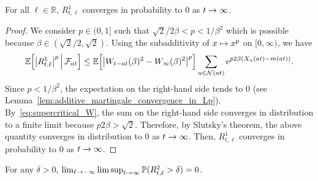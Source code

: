 \documentclass[AHL,Unicode,longabstracts,published]{cedram}
\newcommand{\e}{\mathrm{e}}
\newcommand{\E}{\mathbb{E}}
\renewcommand{\P}{\mathbb{P}}
\newcommand{\R}{\mathbb{R}}
\newcommand\1{\mathds{1}}
\newcommand{\cF}{\mathcal{F}}
\newcommand{\cN}{\mathcal{N}}
\newcommand{\Expec}[1]{\mathbb{E}\left[#1\right]}
\let\originalleft\left
\let\originalright\right
\renewcommand{\left}{\mathopen{}\mathclose\bgroup\originalleft}
\renewcommand{\right}{\aftergroup\egroup\originalright}
\renewcommand*{\to}{\mathchoice{\longrightarrow}{\rightarrow}{\rightarrow}{\rightarrow}}
\let\oldmapsto\mapsto
\renewcommand*{\mapsto}{\mathchoice{\longmapsto}{\oldmapsto}{\oldmapsto}{\oldmapsto}}
\begin{document}
\pagebreak

\begin{lemm}\label{lem:renormalized_subcritical_overlap_replacement}
For all $\ell \in \R$, $R_{t, \ell}^1$ converges in probability to $0$ as $t \to \infty$.
\end{lemm}

\begin{proof}
We consider $p \in (0,1]$ such that $\sqrt{2}/2\beta < p < 1/\beta^2$ which is possible because $\beta \in (\sqrt{2}/2, \sqrt{2})$. Using the subadditivity of $x \mapsto x^p$ on $[0, \infty)$, we have
\begin{equation*}
\E \left[\left|R_{t, \ell}^1\right|^p \,\middle|\, \cF_{at} \right]
\leq \Expec{ \left|W_{t - at}(\beta)^2 - W_\infty(\beta)^2\right|^p } \sum_{u \in \cN(at)} \e^{p2\beta(X_u(at) - m(at))}.
\end{equation*}
Since $p <1/\beta^2$, the expectation on the right-hand side tends to 0 (see Lemma~\ref{lem:additive_martingale_convergence_in_Lp}). By~\eqref{eq:supercritical_W}, the sum on the right-hand side converges in distribution to a finite limit because $p 2\beta > \sqrt{2}$. Therefore, by Slutsky's theorem, the above quantity converges in distribution to $0$ as $t \to \infty$. Then, $R_{t, \ell}^1$ converges in probability to $0$ as $t \to \infty$.
\end{proof}

\begin{lemm}\label{lem:renormalized_subcritical_overlap_contribution}
For any $\delta > 0$, $\lim_{\ell \to -\infty} \limsup_{t \to \infty} \P(R_{t,\ell}^2 > \delta) = 0$.
\end{lemm}
\end{document}
